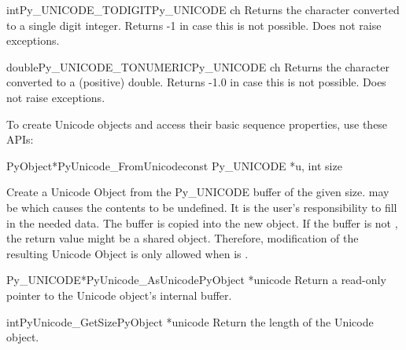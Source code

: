 \documentclass{manual}
\begin{document}
\begin{cfuncdesc}{int}{Py_UNICODE_TODIGIT}{Py_UNICODE ch}
Returns the character  converted to a single digit integer.
Returns -1 in case this is not possible. Does not raise exceptions.
\end{cfuncdesc}

\begin{cfuncdesc}{double}{Py_UNICODE_TONUMERIC}{Py_UNICODE ch}
Returns the character  converted to a (positive) double.
Returns -1.0 in case this is not possible. Does not raise exceptions.
\end{cfuncdesc}


To create Unicode objects and access their basic sequence properties,
use these APIs:

\begin{cfuncdesc}{PyObject*}{PyUnicode_FromUnicode}{const Py_UNICODE *u,
                                                    int size} 

Create a Unicode Object from the Py_UNICODE buffer  of the
given size.  may be \NULL{} which causes the contents to be
undefined. It is the user's responsibility to fill in the needed data.
The buffer is copied into the new object. If the buffer is not \NULL{},
the return value might be a shared object. Therefore, modification of
the resulting Unicode Object is only allowed when  is \NULL{}.
\end{cfuncdesc}

\begin{cfuncdesc}{Py_UNICODE*}{PyUnicode_AsUnicode}{PyObject *unicode}
Return a read-only pointer to the Unicode object's internal
 buffer.
\end{cfuncdesc}

\begin{cfuncdesc}{int}{PyUnicode_GetSize}{PyObject *unicode}
Return the length of the Unicode object.
\end{cfuncdesc}
\end{document}
